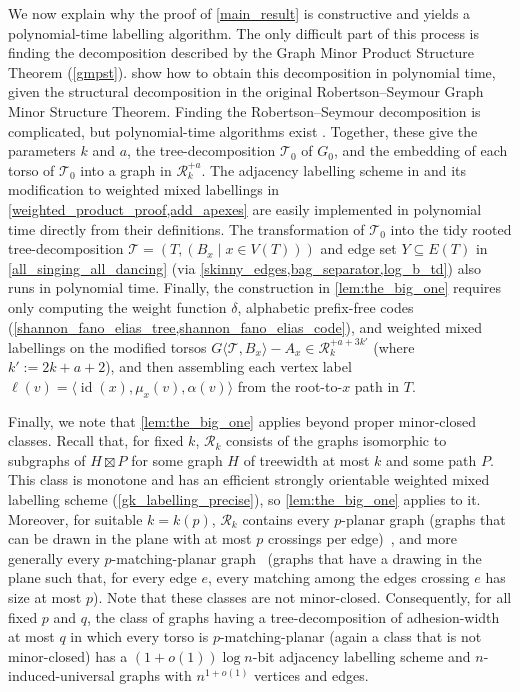 \documentclass{patmorin}
\DeclareMathOperator{\id}{id}
\newcommand{\torso}[2]{{#1}\langle{#2}\rangle}
\newcommand{\calR}{\mathcal{R}}
\newcommand{\calT}{\mathcal{T}}
\begin{document}
We now explain why the proof of \cref{main_result} is constructive and yields a polynomial-time labelling algorithm.  The only difficult part of this process is finding the decomposition described by the Graph Minor Product Structure Theorem (\cref{gmpst}).  \citet{dujmovic.joret.ea:planar} show how to obtain this decomposition in polynomial time, given the structural decomposition in the original Robertson--Seymour Graph Minor Structure Theorem. Finding the Robertson--Seymour decomposition is complicated, but polynomial-time algorithms exist \cite{kawarabayashi2018flat,kawarabayashi2020new,gorsky2025polynomial,demaine2005algorithmic}.  Together, these give the parameters $k$ and $a$, the tree-decomposition $\calT_0$ of $G_0$, and the embedding of each torso of $\calT_0$ into a graph in $\calR_k^{+a}$. The adjacency labelling scheme in \cite{dujmovic.esperet.ea:adjacency} and its modification to weighted mixed labellings in \cref{weighted_product_proof,add_apexes} are easily implemented in polynomial time directly from their definitions.  The transformation of $\calT_0$ into the tidy rooted tree-decomposition $\calT=(T,(B_x\mid x\in V(T)))$ and edge set $Y\subseteq E(T)$ in \cref{all_singing_all_dancing} (via \cref{skinny_edges,bag_separator,log_b_td}) also runs in polynomial time.  Finally, the construction in \cref{lem:the_big_one} requires only computing the weight function $\delta$, alphabetic prefix-free codes (\cref{shannon_fano_elias_tree,shannon_fano_elias_code}), and weighted mixed labellings on the modified torsos $\torso{G}{\calT,B_x}-A_x\in\calR_k^{+a+3k'}$ (where $k':=2k+a+2$), and then assembling each vertex label $\ell(v)=\langle\id(x),\mu_x(v),\alpha(v)\rangle$ from the root-to-$x$ path in $T$.


Finally, we note that \cref{lem:the_big_one} applies beyond proper minor-closed classes. Recall that, for fixed $k$, $\calR_k$ consists of the graphs isomorphic to subgraphs of $H\boxtimes P$ for some graph $H$ of treewidth at most $k$ and some path $P$. This class is monotone and has an efficient strongly orientable weighted mixed labelling scheme (\cref{gk_labelling_precise}), so \cref{lem:the_big_one} applies to it. Moreover, for suitable $k=k(p)$, $\calR_k$ contains every $p$-planar graph (graphs that can be drawn in the plane with at most $p$ crossings per edge)~\citep{dujmovic.morin.ea:graph}, and more generally every $p$-matching-planar graph~\citep{DBLP:journals/corr/abs-2507-22395} (graphs that have a drawing in the plane such that, for every edge $e$, every matching among the edges crossing $e$ has size at most $p$). Note that these classes are not minor-closed. Consequently, for all fixed $p$ and $q$, the class of graphs having a tree-decomposition of adhesion-width at most $q$ in which every torso is $p$-matching-planar (again a class that is not minor-closed) has a $(1+o(1))\log n$-bit adjacency labelling scheme and $n$-induced-universal graphs with $n^{1+o(1)}$ vertices and edges.
\end{document}
